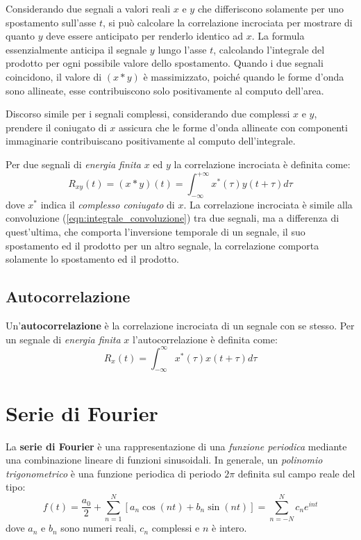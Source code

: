 \documentclass[a4paper, titlepage, oneside]{scrbook}
\begin{document}
Considerando due segnali a valori reali $x$ e $y$ che differiscono solamente per uno spostamento sull'asse $t$, si può calcolare la correlazione incrociata per mostrare
di quanto $y$ deve essere anticipato per renderlo identico ad $x$. La formula essenzialmente anticipa il segnale $y$ lungo l'asse $t$, calcolando l'integrale del prodotto
per ogni possibile valore dello spostamento. Quando i due segnali coincidono, il valore di $(x*y)$ è massimizzato, poiché quando le forme d'onda sono allineate, esse
contribuiscono solo positivamente al computo dell'area.

Discorso simile per i segnali complessi, considerando due complessi $x$ e $y$, prendere il coniugato di $x$ assicura che le forme d'onda allineate con componenti
immaginarie contribuiscano positivamente al computo dell'integrale.

Per due segnali di \textit{energia finita} $x$ ed $y$ la correlazione incrociata è definita come:
\begin{equation}
	R_{xy}(t)=(x*y)(t) = \int_{-\infty}^{+\infty}x^*(\tau)y(t+\tau)d\tau
	\label{eqn:correlazione_incrociata}
\end{equation}
dove $x^*$ indica il \textit{complesso coniugato} di $x$.
La correlazione incrociata è simile alla convoluzione (\ref{eqn:integrale_convoluzione}) tra due segnali, ma a differenza di quest'ultima, che comporta l'inversione
temporale di un segnale, il suo spostamento ed il prodotto per un altro segnale, la correlazione comporta solamente lo spostamento ed il prodotto.

\subsection{Autocorrelazione}
Un'\textbf{autocorrelazione} è la correlazione incrociata di un segnale con se stesso. Per un segnale di \textit{energia finita} $x$ l'autocorrelazione è definita come:
\begin{equation}
	R_x(t)=\int_{-\infty}^{\infty}x^*(\tau)x(t+\tau)d\tau
	\label{eqn:autocorrelazione}
\end{equation}

\section{Serie di Fourier}
La \textbf{serie di Fourier} è una rappresentazione di una \textit{funzione periodica} mediante una combinazione lineare di funzioni sinusoidali.
In generale, un \textit{polinomio trigonometrico} è una funzione periodica di periodo $2\pi$ definita sul campo reale del tipo:
\begin{equation}
	f(t)=\frac{a_0}{2}+\sum_{n=1}^{N}[a_n \cos(nt)+b_n\sin(nt)]=\sum_{n=-N}^{N}c_ne^{int}
	\label{eqn:serie_fourier}
\end{equation}
dove $a_n$ e $b_n$ sono numeri reali, $c_n$ complessi e $n$ è intero.
\end{document}
